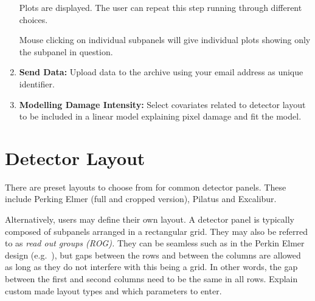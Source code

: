 \documentclass[11pt,a4paper,twosided]{article}
\begin{document}
\begin{mdframed}
\begin{enumerate}
Plots are displayed. The user can repeat this step running through different choices. 

Mouse clicking on individual subpanels will give individual plots showing only the subpanel in question.

\item {\bf Send Data:} 
Upload data to the archive using your email address as unique identifier.

\item {\bf Modelling Damage Intensity:} 
Select covariates related to detector layout to be included in a linear model explaining pixel damage
and fit the model.

\end{enumerate}

\medskip

\end{mdframed}

\medskip

\section{Detector Layout}\label{layout}

There are preset layouts to choose from for common detector panels. These include
Perking Elmer (full and cropped version), Pilatus and Excalibur.

Alternatively, users may define their own layout. 
A detector panel is typically composed of subpanels arranged in a rectangular grid. They may also be referred to as {\it read out groups (ROG).}
They can be seamless such as in the Perkin Elmer design (e.g.~\cite{manualXRD1621}), but gaps between the rows
and between the columns are allowed as long as they do not interfere with this being a grid.
In other words, the gap between the first and second columns need to be the same in all rows.
Explain custom made layout types and which parameters to enter.
\end{document}
